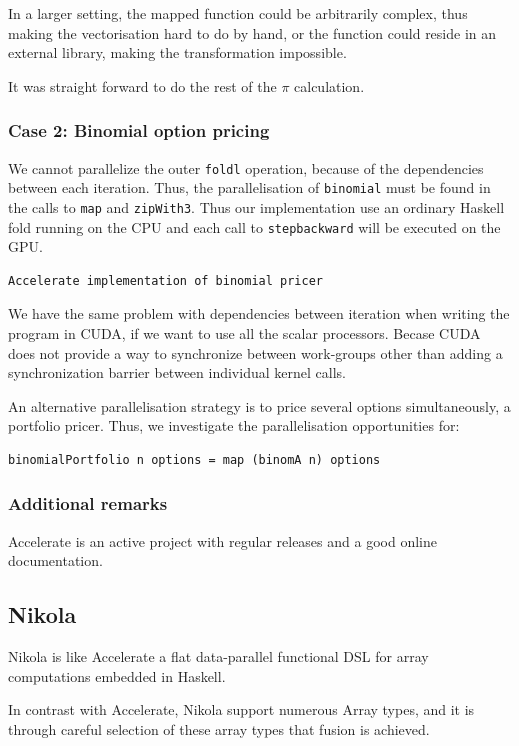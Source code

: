 \documentclass[preprint]{sigplanconf}
\begin{document}
In a larger setting, the mapped function could be arbitrarily complex,
thus making the vectorisation hard to do by hand, or the function could
reside in an external library, making the transformation impossible.

It was straight forward to do the rest of the $\pi$ calculation.

\subsubsection{Case 2: Binomial option pricing}
We cannot parallelize the outer \verb|foldl| operation,
because of the dependencies between each iteration. Thus, the
parallelisation of \verb|binomial| must be found in the calls to
\verb|map| and \verb|zipWith3|. Thus our implementation use an
ordinary Haskell fold running on the CPU and each call to
\verb|stepbackward| will be executed on the GPU.
\begin{verbatim}
Accelerate implementation of binomial pricer
\end{verbatim}

We have the same problem with dependencies between iteration when
writing the program in CUDA, if we want to use all the scalar
processors. Becase CUDA does not provide a way to synchronize between
work-groups other than adding a synchronization barrier between
individual kernel calls.

An alternative parallelisation strategy is to price several
options simultaneously, a portfolio pricer. Thus, we investigate
the parallelisation opportunities for:
\begin{verbatim}
binomialPortfolio n options = map (binomA n) options
\end{verbatim}

\subsubsection{Additional remarks} Accelerate is an active project
with regular releases and a good online documentation. 

\subsection{Nikola}
Nikola is like Accelerate a flat data-parallel functional DSL for
array computations embedded in Haskell.

In contrast with Accelerate, Nikola support numerous Array types, and
it is through careful selection of these array types that fusion is
achieved.
\end{document}
